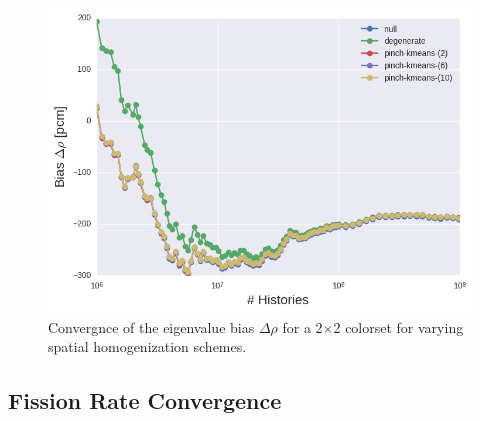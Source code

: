 \begin{figure}[h!]
\centering
\includegraphics[width=0.85\linewidth]{figures/results/2x2/ensemble-transform/keff-bias}
\vspace{2mm}
\caption[Eigenvalue bias covergence for a 2$\times$2 colorset]{Convergnce of the eigenvalue bias $\Delta\rho$ for a 2$\times$2 colorset for varying spatial homogenization schemes.}
\label{fig:chap11-2x2-eigenvalue-converge}
\end{figure}

\clearpage


\subsection{Fission Rate Convergence}
\label{subsec:chap11-fission-converge}

\clearpage

